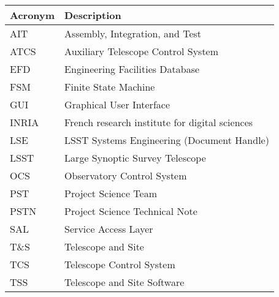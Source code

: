 \addtocounter{table}{-1}
\begin{longtable}{|l|p{}|}\hline
\textbf{Acronym} & \textbf{Description}  \\\hline

AIT & Assembly, Integration, and Test \\\hline
ATCS & Auxiliary  Telescope Control System \\\hline
EFD & Engineering Facilities Database \\\hline
FSM & Finite State Machine \\\hline
GUI & Graphical User Interface \\\hline
INRIA & French research institute for digital sciences \\\hline
LSE & LSST Systems Engineering (Document Handle) \\\hline
LSST & Large Synoptic Survey Telescope \\\hline
OCS & Observatory Control System \\\hline
PST & Project Science Team \\\hline
PSTN & Project Science Technical Note \\\hline
SAL & Service Access Layer \\\hline
T\&S & Telescope and Site \\\hline
TCS & Telescope Control System \\\hline
TSS & Telescope and Site Software \\\hline
\end{longtable}
